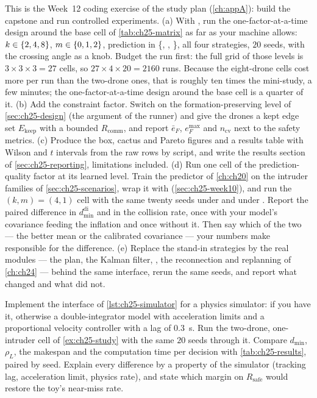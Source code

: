 \begin{exercise}
\label{exr:ch25-coding}
This is the Week~12 coding exercise of the study plan (\cref{ch:appA}):
build the capstone and run controlled experiments. (a) With
, run the one-factor-at-a-time design around the
base cell of \cref{tab:ch25-matrix} as far as your machine allows: $k \in
\left\{ 2, 4, 8 \right\}$, $m \in \left\{ 0, 1, 2 \right\}$, prediction in
\{, , \}, all four strategies, $20$
seeds, with the crossing angle as a knob. Budget the run first: the full
grid of those levels is $3 \times 3 \times 3 = 27$ cells, so
$27 \times 4 \times 20 = 2160$ runs. Because the eight-drone cells cost
more per run than the two-drone ones, that is roughly ten times the
mini-study, a few minutes; the one-factor-at-a-time design around the base
cell is a quarter of it. (b) Add the constraint factor. Switch on the
formation-preserving level of \cref{sec:ch25-design} (the 
argument of the runner) and give the drones a kept edge set
$E_{\mathrm{keep}}$ with a bounded $R_{\mathrm{comm}}$, and report
$\bar e_F$, $e_F^{\max}$ and $n_{\mathrm{cv}}$ next to the safety metrics.
(c) Produce the box, cactus and
Pareto figures and a results table with Wilson and $t$ intervals from the
raw rows by script, and write the results section of
\cref{sec:ch25-reporting}, limitations included. (d) Run one cell of the
prediction-quality factor at its learned level. Train the predictor of
\cref{ch:ch20} on the intruder families of \cref{sec:ch25-scenarios}, wrap
it with  (\cref{sec:ch25-week10}), and run the
$(k, m) = (4, 1)$ cell with the same twenty seeds under
 and under . Report the
paired difference in $d_{\min}^{\mathrm{di}}$ and in the collision rate,
once with your model's covariance feeding the inflation and once without it.
Then say which of the two --- the better mean or the calibrated covariance
--- your numbers make responsible for the difference. (e) Replace the
stand-in strategies by the real modules --- the \cbs plan, the Kalman
filter, \orca, the reconnection and \dstarlite replanning of
\cref{ch:ch24} --- behind the same  interface, rerun
the same seeds, and report what changed and what did not.
\end{exercise}

\begin{exercise}[\difficulty{3}]
\label{exr:ch25-simulator}
Implement the interface of \cref{lst:ch25-simulator} for a physics
simulator:  \cite{panerati2021learning} if you
have it, otherwise a double-integrator model with acceleration limits and a
proportional velocity controller with a lag of $0.3$~s. Run the two-drone,
one-intruder cell of \cref{ex:ch25-study} with the same $20$ seeds through
it. Compare $d_{\min}$, $\rho_L$, the makespan and the computation time per
decision with \cref{tab:ch25-results}, paired by seed. Explain every
difference by a property of the simulator (tracking lag, acceleration
limit, physics rate), and state which margin on $R_{\mathrm{safe}}$ would
restore the toy's near-miss rate.
\end{exercise}

